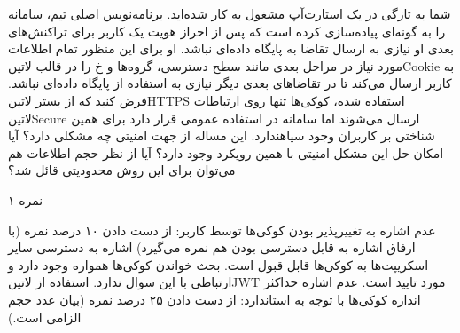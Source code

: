 
شما به تازگی در یک استارت‌آپ مشغول به کار شده‌اید.
برنامه‌نویس اصلی تیم، سامانه را به گونه‌ای پیاده‌سازی کرده است که پس از احراز هویت یک کاربر
برای تراکنش‌های بعدی او نیازی به ارسال تقاضا به پایگاه داده‌ای نباشد.
او برای این منظور تمام اطلاعات مورد نیاز در مراحل بعدی مانند سطح دسترسی، گروه‌ها و ‌خ را در قالب ‌لاتین{Cookie}
به کاربر ارسال می‌کند تا در تقاضاهای بعدی دیگر نیازی به استفاده از پایگاه داده‌ای نباشد.
فرض کنید که از بستر ‌لاتین{HTTPS} استفاده شده، کوکی‌ها تنها روی ارتباطات ‌لاتین{Secure} ارسال می‌شوند اما سامانه در استفاده عمومی قرار دارد برای همین شناختی بر کاربران وجود ‌سیاه{ندارد}.
این مساله از جهت امنیتی چه مشکلی دارد؟ آیا امکان حل این مشکل امنیتی با همین رویکرد وجود دارد؟
آیا از نظر حجم اطلاعات هم می‌توان برای این روش محدودیتی قائل شد؟

۱ نمره

\begin{پاسخ}

 عدم اشاره به تغییرپذیر بودن کوکی‌ها توسط کاربر: از دست دادن ۱۰ درصد نمره (با ارفاق اشاره به قابل دسترسی بودن هم نمره می‌گیرد)
 اشاره به دسترسی سایر اسکریپت‌ها به کوکی‌ها قابل قبول است.
 بحث خواندن کوکی‌ها همواره وجود دارد و ارتباطی با این سوال ندارد.
 استفاده از ‌لاتین{JWT} مورد تایید است.
 عدم اشاره حداکثر اندازه کوکی‌ها با توجه به استاندارد: از دست دادن ۲۵ درصد نمره (بیان عدد حجم الزامی است.)

\end{پاسخ}
